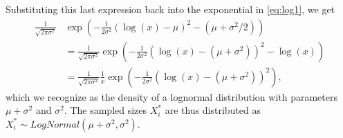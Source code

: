 \documentclass[10pt,a4paper]{article}
\begin{document}
Substituting this last expression back into the exponential in \eqref{eq:log1}, we get
\begin{align*}
	\frac{1}{\sqrt{2 \pi \sigma^2}} &\exp \left( -\frac{1}{2 \sigma^2} \left( \log(x) - \mu \right)^2 - (\mu + \sigma^2 / 2) \right) \\[5pt]
	&= \frac{1}{\sqrt{2 \pi \sigma^2}} \exp \left( -\frac{1}{2 \sigma^2} \left( \log(x) - (\mu + \sigma^2) \right)^2 - \log(x) \right) \\[5pt]
	&= \frac{1}{\sqrt{2 \pi \sigma^2}} \frac{1}{x} \exp \left( -\frac{1}{2 \sigma^2} \left( \log(x) - (\mu + \sigma^2) \right)^2 \right),
\end{align*}
which we recognize as the density of a lognormal distribution with parameters $\mu+\sigma^2$ and $\sigma^2$. The sampled sizes $X_i^*$ are thus distributed as $X_i^* \sim LogNormal(\mu+\sigma^2, \sigma^2)$.
\end{document}
